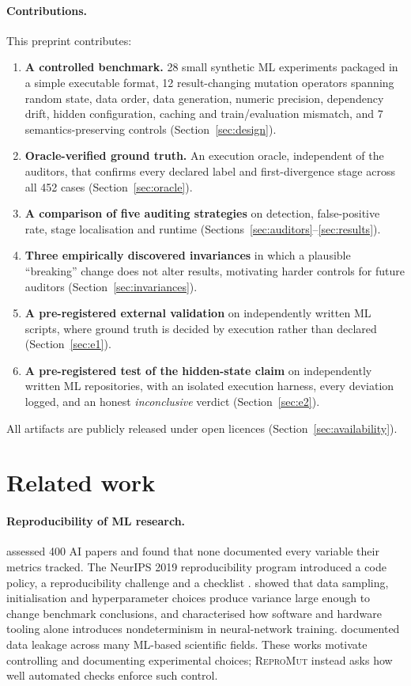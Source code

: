 \documentclass[11pt]{article}
\newcommand{\RM}{\textsc{ReproMut}}
\begin{document}
\paragraph{Contributions.} This preprint contributes:
\begin{enumerate}
  \item \textbf{A controlled benchmark.} 28 small synthetic ML experiments packaged in a simple executable format, 12 result-changing mutation operators spanning random state, data order, data generation, numeric precision, dependency drift, hidden configuration, caching and train/evaluation mismatch, and 7 semantics-preserving controls (Section~\ref{sec:design}).
  \item \textbf{Oracle-verified ground truth.} An execution oracle, independent of the auditors, that confirms every declared label and first-divergence stage across all 452 cases (Section~\ref{sec:oracle}).
  \item \textbf{A comparison of five auditing strategies} on detection, false-positive rate, stage localisation and runtime (Sections~\ref{sec:auditors}--\ref{sec:results}).
  \item \textbf{Three empirically discovered invariances} in which a plausible ``breaking'' change does not alter results, motivating harder controls for future auditors (Section~\ref{sec:invariances}).
  \item \textbf{A pre-registered external validation} on independently written ML scripts, where ground truth is decided by execution rather than declared (Section~\ref{sec:e1}).
  \item \textbf{A pre-registered test of the hidden-state claim} on independently written ML repositories, with an isolated execution harness, every deviation logged, and an honest \emph{inconclusive} verdict (Section~\ref{sec:e2}).
\end{enumerate}
All artifacts are publicly released under open licences (Section~\ref{sec:availability}).

\section{Related work}
\label{sec:related}

\paragraph{Reproducibility of ML research.} \citet{gundersen2018state} assessed 400 AI papers and found that none documented every variable their metrics tracked. The NeurIPS 2019 reproducibility program introduced a code policy, a reproducibility challenge and a checklist \citep{pineau2021improving}. \citet{bouthillier2021accounting} showed that data sampling, initialisation and hyperparameter choices produce variance large enough to change benchmark conclusions, and \citet{zhuang2022randomness} characterised how software and hardware tooling alone introduces nondeterminism in neural-network training. \citet{kapoor2023leakage} documented data leakage across many ML-based scientific fields. These works motivate controlling and documenting experimental choices; \RM{} instead asks how well automated checks enforce such control.
\end{document}
